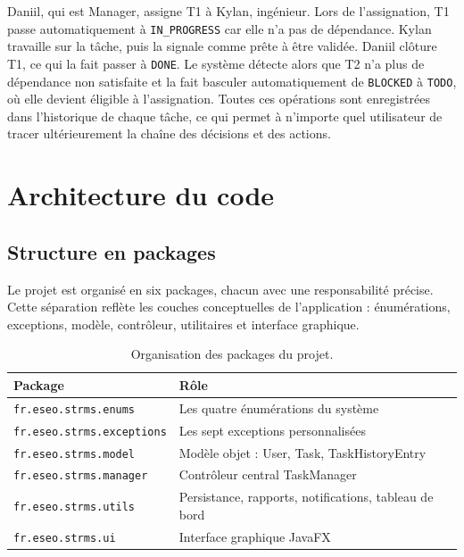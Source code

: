 \documentclass[11pt]{article}
\begin{document}
Daniil, qui est Manager, assigne T1 à Kylan, ingénieur. Lors de
l'assignation, T1 passe automatiquement à \texttt{IN\_PROGRESS} car elle
n'a pas de dépendance. Kylan travaille sur la tâche, puis la signale
comme prête à être validée. Daniil clôture T1, ce qui la fait passer à
\texttt{DONE}. Le système détecte alors que T2 n'a plus de dépendance non
satisfaite et la fait basculer automatiquement de \texttt{BLOCKED} à
\texttt{TODO}, où elle devient éligible à l'assignation. Toutes ces
opérations sont enregistrées dans l'historique de chaque tâche, ce qui
permet à n'importe quel utilisateur de tracer ultérieurement la chaîne
des décisions et des actions.

\section{Architecture du code}

\subsection{Structure en packages}
Le projet est organisé en six packages, chacun avec une responsabilité
précise. Cette séparation reflète les couches conceptuelles de
l'application : énumérations, exceptions, modèle, contrôleur, utilitaires
et interface graphique.

\begin{table}[H]
\centering
\small
\begin{tabular}{ll}
\toprule
\textbf{Package} & \textbf{Rôle} \\
\midrule
\texttt{fr.eseo.strms.enums}      & Les quatre énumérations du système \\
\texttt{fr.eseo.strms.exceptions} & Les sept exceptions personnalisées \\
\texttt{fr.eseo.strms.model}      & Modèle objet : User, Task, TaskHistoryEntry \\
\texttt{fr.eseo.strms.manager}    & Contrôleur central TaskManager \\
\texttt{fr.eseo.strms.utils}      & Persistance, rapports, notifications, tableau de bord \\
\texttt{fr.eseo.strms.ui}         & Interface graphique JavaFX \\
\bottomrule
\end{tabular}
\caption{Organisation des packages du projet.}
\end{table}
\end{document}
